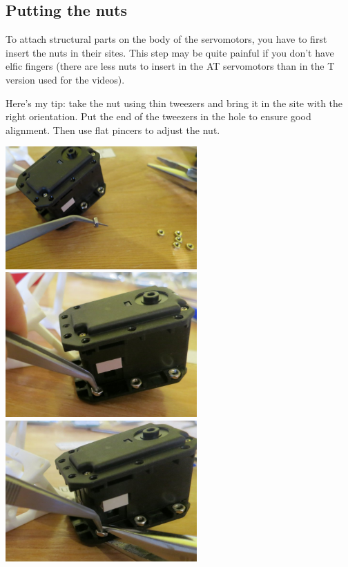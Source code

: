 \documentclass[includefoot]{article}
\begin{document}
\subsection{Putting the nuts}

To attach structural parts on the body of the servomotors, you have to first insert the nuts in their sites. This step may be quite painful if you don't have elfic fingers (there are less nuts to insert in the AT servomotors than in the T version used for the videos).

Here's my tip: take the nut using thin tweezers and bring it in the site with the right orientation. Put the end of the tweezers in the hole to ensure good alignment. Then use flat pincers to adjust the nut.

 \begin{center}
  \includegraphics[width=0.55\textwidth]{img/nuts1}
  \includegraphics[width=0.55\textwidth]{img/nuts2}
  \includegraphics[width=0.55\textwidth]{img/nuts3}
 \end{center}
 
\end{document}
